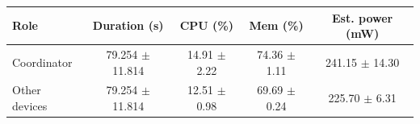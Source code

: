 \begin{tabular}{lcccc}
\hline
\textbf{Role} & \textbf{Duration (s)} & \textbf{CPU (\%)} & \textbf{Mem (\%)} & \textbf{Est. power (mW)} \\
\hline
Coordinator & 79.254 $\pm$ 11.814 & 14.91 $\pm$ 2.22 & 74.36 $\pm$ 1.11 & 241.15 $\pm$ 14.30 \\
Other devices & 79.254 $\pm$ 11.814 & 12.51 $\pm$ 0.98 & 69.69 $\pm$ 0.24 & 225.70 $\pm$ 6.31 \\
\hline
\end{tabular}
